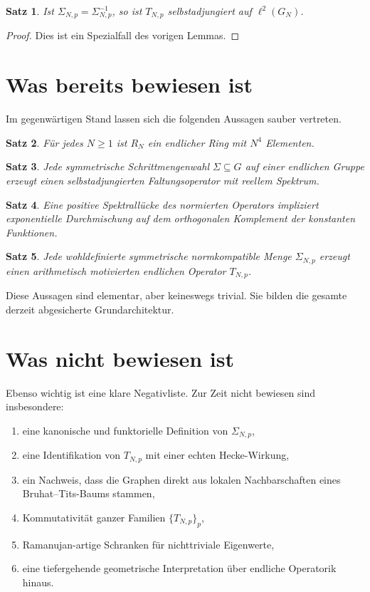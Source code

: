 \documentclass[12pt,a4paper]{article}
\theoremstyle{plain}
\newtheorem{satz}{Satz}[section]
\theoremstyle{definition}
\theoremstyle{remark}
\newcommand{\ellz}{\ell^2}
\begin{document}
	\begin{satz}
		Ist $\Sigma_{N,p}=\Sigma_{N,p}^{-1}$, so ist $T_{N,p}$ selbstadjungiert auf $\ellz(G_N)$.
	\end{satz}
	
	\begin{proof}
		Dies ist ein Spezialfall des vorigen Lemmas.
	\end{proof}
	
	\section{Was bereits bewiesen ist}
	Im gegenwärtigen Stand lassen sich die folgenden Aussagen sauber vertreten.
	
	\begin{satz}
		Für jedes $N\ge 1$ ist $R_N$ ein endlicher Ring mit $N^4$ Elementen.
	\end{satz}
	
	\begin{satz}
		Jede symmetrische Schrittmengenwahl $\Sigma\subseteq G$ auf einer endlichen Gruppe erzeugt einen selbstadjungierten Faltungsoperator mit reellem Spektrum.
	\end{satz}
	
	\begin{satz}
		Eine positive Spektrallücke des normierten Operators impliziert exponentielle Durchmischung auf dem orthogonalen Komplement der konstanten Funktionen.
	\end{satz}
	
	\begin{satz}
		Jede wohldefinierte symmetrische normkompatible Menge $\Sigma_{N,p}$ erzeugt einen arithmetisch motivierten endlichen Operator $T_{N,p}$.
	\end{satz}
	
	Diese Aussagen sind elementar, aber keineswegs trivial. Sie bilden die gesamte derzeit abgesicherte Grundarchitektur.
	
	\section{Was nicht bewiesen ist}
	Ebenso wichtig ist eine klare Negativliste. Zur Zeit nicht bewiesen sind insbesondere:
	\begin{enumerate}[label=(\arabic*)]
		\item eine kanonische und funktorielle Definition von $\Sigma_{N,p}$,
		\item eine Identifikation von $T_{N,p}$ mit einer echten Hecke-Wirkung,
		\item ein Nachweis, dass die Graphen direkt aus lokalen Nachbarschaften eines Bruhat--Tits-Baums stammen,
		\item Kommutativität ganzer Familien $\{T_{N,p}\}_p$,
		\item Ramanujan-artige Schranken für nichttriviale Eigenwerte,
		\item eine tiefergehende geometrische Interpretation über endliche Operatorik hinaus.
	\end{enumerate}
	
\end{document}
